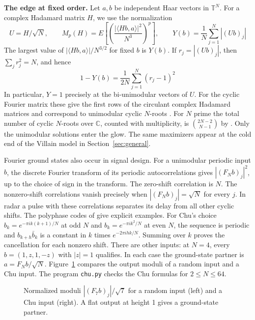 \documentclass[11pt,a4paper]{article}
\theoremstyle{remark}
\begin{document}
\medskip

\noindent\textbf{The edge at fixed order.}
Let $a,b$ be independent Haar vectors in $\mathbb T^N$. For a complex
Hadamard matrix $H$, we use the normalization
\[
 U=H/\sqrt N,\qquad M_p(H)=E\left[\left(\frac{|\langle Hb,a\rangle|^2}{N^3}\right)^p\right],
 \qquad Y(b)=\frac1N\sum_{j=1}^N|(Ub)_j|
\]
The largest value of $|\langle Hb,a\rangle|/N^{3/2}$ for fixed $b$ is $Y(b)$.
If $r_j=|(Ub)_j|$, then $\sum_j r_j^2=N$, and hence
\[
 1-Y(b)=\frac{1}{2N}\sum_{j=1}^N(r_j-1)^2
\]
In particular, $Y=1$ precisely at the bi-unimodular vectors of $U$.
For the cyclic Fourier matrix these give the first rows of the circulant
complex Hadamard matrices and correspond to unimodular cyclic $N$-roots
\cite{bjo,haa}. For $N$ prime the total number of cyclic $N$-roots over
$\mathbb C$, counted with multiplicity, is $\binom{2N-2}{N-1}$ by
\cite{haa}. Only the unimodular solutions enter the glow. The same
maximizers appear at the cold end of the Villain model in
Section~\ref{sec:general}.

Fourier ground states also occur in signal design. For a unimodular periodic input $b$, the discrete Fourier transform of its periodic autocorrelations gives $|(F_Nb)_j|^2$, up to the choice of sign in the transform. The zero-shift correlation is $N$. The nonzero-shift correlations vanish precisely when $|(F_Nb)_j|=\sqrt N$ for every $j$. In radar a pulse with these correlations separates its delay from all other cyclic shifts. The polyphase codes of \cite{fza,chu} give explicit examples. For Chu's choice $b_k=e^{-\pi ik(k+1)/N}$ at odd $N$ and $b_k=e^{-\pi ik^2/N}$ at even $N$, the sequence is periodic and $b_{k+h}\bar b_k$ is a constant in $k$ times $e^{-2\pi ihk/N}$. Summing over $k$ proves the cancellation for each nonzero shift. There are other inputs: at $N=4$, every $b=(1,z,1,-z)$ with $|z|=1$ qualifies. In each case the ground-state partner is $a=F_Nb/\sqrt N$. Figure~\ref{fig:chu} compares the output moduli of a random input and a Chu input. The program \texttt{chu.py} checks the Chu formulas for $2\le N\le64$.

\begin{figure}[htb!]
\centering
{}
\caption{Normalized moduli $|(F_7b)_j|/\sqrt7$ for a random input (left) and a Chu input (right). A flat output at height 1 gives a ground-state partner.}\label{fig:chu}
\end{figure}
\end{document}
